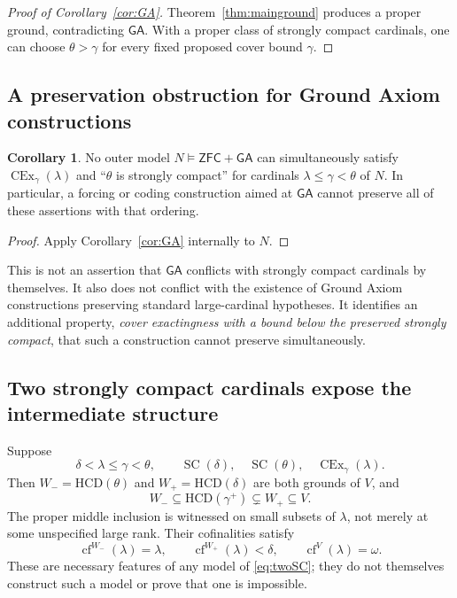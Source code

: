 \documentclass[11pt,letterpaper]{article}
\theoremstyle{definition}
\newtheorem{corollary}[definition]{Corollary}
\newcommand{\ZFC}{\mathsf{ZFC}}
\newcommand{\SC}{\operatorname{SC}}
\newcommand{\CEx}{\operatorname{CEx}}
\newcommand{\cf}{\operatorname{cf}}
\newcommand{\HCD}{\mathrm{HCD}}
\newcommand{\GA}{\mathsf{GA}}
\numberwithin{equation}{section}
\begin{document}
\begin{proof}[Proof of Corollary~\ref{cor:GA}]
Theorem~\ref{thm:mainground} produces a proper ground, contradicting $\GA$. With a proper class of strongly compact cardinals, one can choose $\theta>\gamma$ for every fixed proposed cover bound $\gamma$.
\end{proof}

\subsection{A preservation obstruction for Ground Axiom constructions}

\begin{corollary}\label{cor:preservation}
No outer model $N\models\ZFC+\GA$ can simultaneously satisfy $\CEx_\gamma(\lambda)$ and ``$\theta$ is strongly compact'' for cardinals $\lambda\leq\gamma<\theta$ of $N$. In particular, a forcing or coding construction aimed at $\GA$ cannot preserve all of these assertions with that ordering.
\end{corollary}

\begin{proof}
Apply Corollary~\ref{cor:GA} internally to $N$.
\end{proof}

This is not an assertion that $\GA$ conflicts with strongly compact cardinals by themselves. It also does not conflict with the existence of Ground Axiom constructions preserving standard large-cardinal hypotheses. It identifies an additional property, \emph{cover exactingness with a bound below the preserved strongly compact}, that such a construction cannot preserve simultaneously.

\subsection{Two strongly compact cardinals expose the intermediate structure}

Suppose
\begin{equation}\label{eq:twoSC}
 \delta<\lambda\leq\gamma<\theta,
 \qquad \SC(\delta),\quad\SC(\theta),\quad\CEx_\gamma(\lambda).
\end{equation}
Then $W_-=\HCD(\theta)$ and $W_+=\HCD(\delta)$ are both grounds of $V$, and
\begin{equation}\label{eq:nested}
 W_-\subseteq\HCD(\gamma^+)\subsetneq W_+\subseteq V.
\end{equation}
The proper middle inclusion is witnessed on small subsets of $\lambda$, not merely at some unspecified large rank. Their cofinalities satisfy
\begin{equation}\label{eq:threecofinal}
 \cf^{W_-}(\lambda)=\lambda,
 \qquad \cf^{W_+}(\lambda)<\delta,
 \qquad \cf^V(\lambda)=\omega.
\end{equation}
These are necessary features of any model of \eqref{eq:twoSC}; they do not themselves construct such a model or prove that one is impossible.
\end{document}
